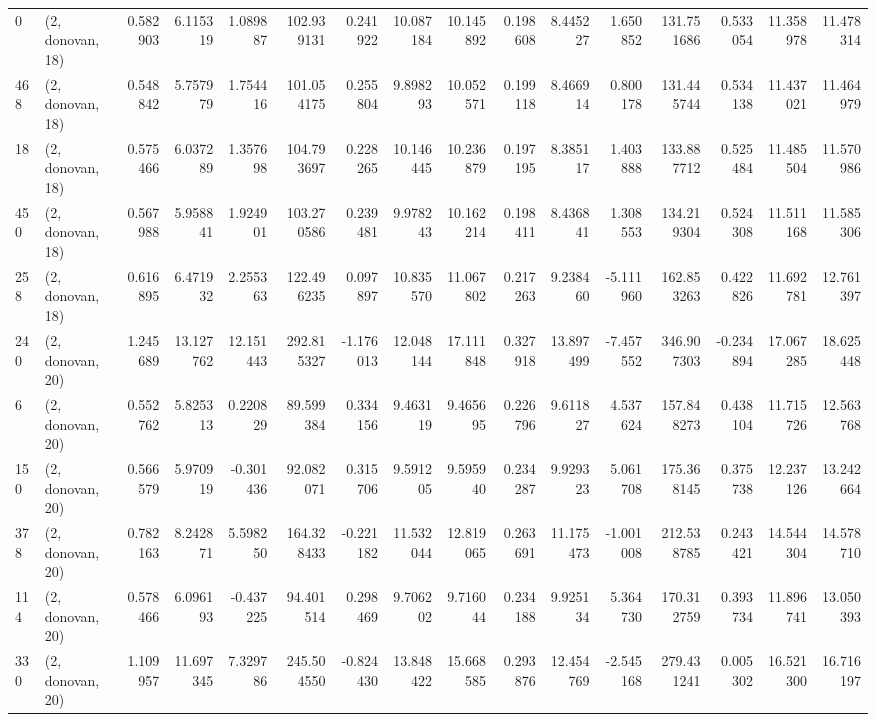 \begin{tabular}{llrrrrrrrrrrrrrr}
0   &  (2, donovan, 18) &   0.582903 &   6.115319 &   1.089887 &   102.939131 &   0.241922 &  10.087184 &  10.145892 &  0.198608 &   8.445227 &   1.650852 &   131.751686 &   0.533054 &  11.358978 &  11.478314 \\
468 &  (2, donovan, 18) &   0.548842 &   5.757979 &   1.754416 &   101.054175 &   0.255804 &   9.898293 &  10.052571 &  0.199118 &   8.466914 &   0.800178 &   131.445744 &   0.534138 &  11.437021 &  11.464979 \\
18  &  (2, donovan, 18) &   0.575466 &   6.037289 &   1.357698 &   104.793697 &   0.228265 &  10.146445 &  10.236879 &  0.197195 &   8.385117 &   1.403888 &   133.887712 &   0.525484 &  11.485504 &  11.570986 \\
450 &  (2, donovan, 18) &   0.567988 &   5.958841 &   1.924901 &   103.270586 &   0.239481 &   9.978243 &  10.162214 &  0.198411 &   8.436841 &   1.308553 &   134.219304 &   0.524308 &  11.511168 &  11.585306 \\
258 &  (2, donovan, 18) &   0.616895 &   6.471932 &   2.255363 &   122.496235 &   0.097897 &  10.835570 &  11.067802 &  0.217263 &   9.238460 &  -5.111960 &   162.853263 &   0.422826 &  11.692781 &  12.761397 \\
240 &  (2, donovan, 20) &   1.245689 &  13.127762 &  12.151443 &   292.815327 &  -1.176013 &  12.048144 &  17.111848 &  0.327918 &  13.897499 &  -7.457552 &   346.907303 &  -0.234894 &  17.067285 &  18.625448 \\
6   &  (2, donovan, 20) &   0.552762 &   5.825313 &   0.220829 &    89.599384 &   0.334156 &   9.463119 &   9.465695 &  0.226796 &   9.611827 &   4.537624 &   157.848273 &   0.438104 &  11.715726 &  12.563768 \\
150 &  (2, donovan, 20) &   0.566579 &   5.970919 &  -0.301436 &    92.082071 &   0.315706 &   9.591205 &   9.595940 &  0.234287 &   9.929323 &   5.061708 &   175.368145 &   0.375738 &  12.237126 &  13.242664 \\
378 &  (2, donovan, 20) &   0.782163 &   8.242871 &   5.598250 &   164.328433 &  -0.221182 &  11.532044 &  12.819065 &  0.263691 &  11.175473 &  -1.001008 &   212.538785 &   0.243421 &  14.544304 &  14.578710 \\
114 &  (2, donovan, 20) &   0.578466 &   6.096193 &  -0.437225 &    94.401514 &   0.298469 &   9.706202 &   9.716044 &  0.234188 &   9.925134 &   5.364730 &   170.312759 &   0.393734 &  11.896741 &  13.050393 \\
330 &  (2, donovan, 20) &   1.109957 &  11.697345 &   7.329786 &   245.504550 &  -0.824430 &  13.848422 &  15.668585 &  0.293876 &  12.454769 &  -2.545168 &   279.431241 &   0.005302 &  16.521300 &  16.716197 \\

\end{tabular}
